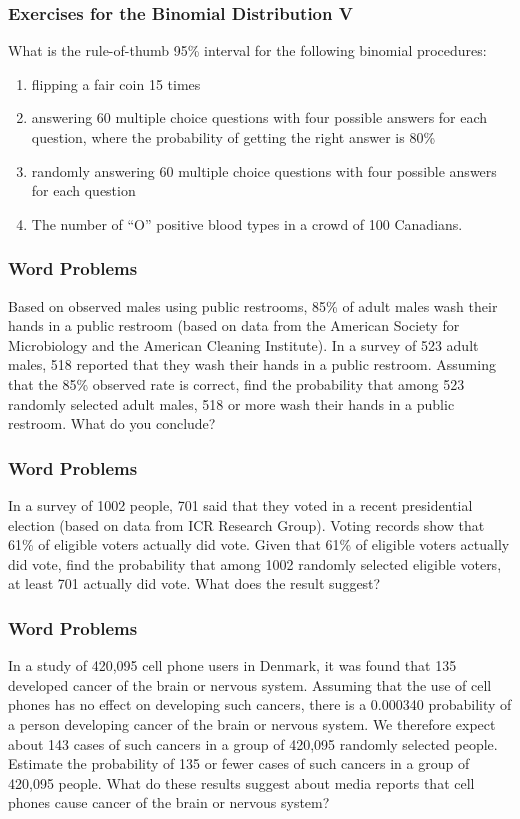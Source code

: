 \documentclass[xcolor=dvipsnames]{beamer}
\begin{document}
\begin{frame}
  \frametitle{Exercises for the Binomial Distribution V}
  {\ubung} What is the rule-of-thumb 95\% interval for the following
  binomial procedures:
  \begin{enumerate}
\item<1-> flipping a fair coin 15 times
\item<2-> answering 60 multiple choice questions with four possible
  answers for each question, where the probability of getting the right answer is 80\%
\item<3-> randomly answering 60 multiple choice questions with four
  possible answers for each question
\item<4-> The number of ``O'' positive blood types in a crowd of 100 Canadians.
  \end{enumerate}
\end{frame}

\begin{frame}
  \frametitle{Word Problems}
  {\ubung} Based on observed males using public restrooms, 85\% of
  adult males wash their hands in a public restroom (based on data
  from the American Society for Microbiology and the American Cleaning
  Institute). In a survey of 523 adult males, 518 reported that they
  wash their hands in a public restroom. Assuming that the 85\%
  observed rate is correct, find the probability that among 523
  randomly selected adult males, 518 or more wash their hands in a
  public restroom. What do you conclude?
\end{frame}

\begin{frame}
  \frametitle{Word Problems}
  {\ubung} In a survey of 1002 people, 701 said that they voted in a
  recent presidential election (based on data from ICR Research
  Group). Voting records show that 61\% of eligible voters actually
  did vote. Given that 61\% of eligible voters actually did vote, find
  the probability that among 1002 randomly selected eligible voters,
  at least 701 actually did vote. What does the result suggest?
\end{frame}

\begin{frame}
  \frametitle{Word Problems}
  {\ubung} In a study of 420,095 cell phone users in Denmark, it was
  found that 135 developed cancer of the brain or nervous system.
  Assuming that the use of cell phones has no effect on developing
  such cancers, there is a 0.000340 probability of a person developing
  cancer of the brain or nervous system. We therefore expect about 143
  cases of such cancers in a group of 420,095 randomly selected
  people. Estimate the probability of 135 or fewer cases of such
  cancers in a group of 420,095 people. What do these results suggest
  about media reports that cell phones cause cancer of the brain or
  nervous system?
\end{frame}
\end{document}
